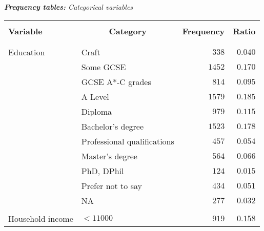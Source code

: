\documentclass[a4paper,12pt]{article}
\begin{document}
\pagebreak

{\centering
\begin{threeparttable}
\caption{\textit{\textbf{Frequency tables:} Categorical variables}}
\label{FreqiencyCat} 
\centering
\begin{small}
\begin{tabular}{llrr} 
\hline \vspace{-0.15cm} \\	
  \multicolumn{1}{l}{\vspace{0.1cm}\textbf{Variable}}& \multicolumn{1}{c}{\textbf{Category}} &  \multicolumn{1}{c}{\textbf{Frequency}}  &  \multicolumn{1}{c}{\textbf{Ratio}}   \\ 
\hline \vspace{-0.3cm} \\ 
 \hline  \vspace{-0.15cm}\\
  \vspace{0.15cm}Education&Craft&$338$&$0.040$\\
  \vspace{0.15cm}&Some GCSE&$1452$&$0.170$\\
  \vspace{0.15cm}&GCSE A*-C grades&$814$&$0.095$\\
  \vspace{0.15cm}&A Level&$1579$&$0.185$\\
  \vspace{0.15cm}&Diploma&\multirow{1}{*}{$979$}&\multirow{1}{*}{$0.115$}\\
    \vspace{0.15cm}&Bachelor's degree&\multirow{1}{*}{$1523$}&\multirow{1}{*}{$0.178$}\\
  \vspace{0.15cm}&Professional qualifications&\multirow{1}{*}{$457$}&\multirow{1}{*}{$0.054$}\\
  \vspace{0.15cm}&Master's degree&$564$&$0.066$\\
  \vspace{0.15cm}&PhD, DPhil&$124$&$0.015$\\
  \vspace{0.15cm}&Prefer not to say&$434$&$0.051$\\
    \vspace{0.15cm}&NA&$277$&$0.032$\\
  \hline  \vspace{-0.15cm} \\
    \vspace{0.15cm}Household income &$<11000$&$919$&$0.158$\\

\end{tabular}
\end{small}
\end{threeparttable}}
\end{document}
